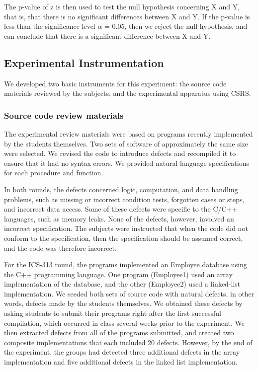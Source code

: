 \normalsize

The p-value of z is then used to test the null hypothesis concerning X and
Y, that is, that there is no significant differences between X and Y.  If
the p-value is less than the significance level $\alpha$ = 0.05, then we
reject the null hypothesis, and can conclude that there is a significant
difference between X and Y.

\subsection{Experimental Instrumentation}

We developed two basic instruments for this experiment: the source
code materials reviewed by the subjects, and the experimental apparatus
using CSRS. 

\subsubsection{Source code review materials}

The experimental review materials were based on programs recently
implemented by the students themselves.  Two sets of software of
approximately the same size were selected.  We revised the code to
introduce defects and recompiled it to ensure that it had no syntax errors.
We provided natural language specifications for each procedure and function.

In both rounds, the defects concerned logic, computation, and data handling
problems, such as missing or incorrect condition tests, forgotten cases or
steps, and incorrect data access. Some of these defects were specific to
the C/C++ languages, such as memory leaks.  None of the defects, however,
involved an incorrect specification. The subjects were instructed that when
the code did not conform to the specification, then the specification
should be assumed correct, and the code was therefore incorrect.

For the ICS-313 round, the programs implemented an Employee database using
the C++ programming language. One program (Employee1) used an array
implementation of the database, and the other (Employee2) used a
linked-list implementation.  We seeded both sets of source code with
natural defects, in other words, defects made by the students themselves.
We obtained these defects by asking students to submit their programs right
after the first successful compilation, which occurred in class several
weeks prior to the experiment.  We then extracted defects from all of the
programs submitted, and created two composite implementations that each
included 20 defects. However, by the end of the experiment, the groups had
detected three additional defects in the array implementation and five
additional defects in the linked list implementation.

